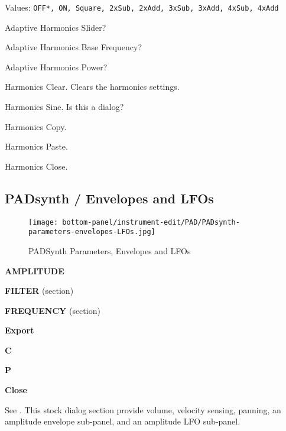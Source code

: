    Values: \texttt{OFF*, ON, Square, 2xSub, 2xAdd, 3xSub, 3xAdd, 4xSub, 4xAdd}

   Adaptive Harmonics Slider?

   Adaptive Harmonics Base Frequency?

   Adaptive Harmonics Power?

   Harmonics Clear.
   Clears the harmonics settings.

   Harmonics Sine.  Is this a dialog?

   Harmonics Copy.

   Harmonics Paste.

   Harmonics Close.

\subsection{PADsynth / Envelopes and LFOs}
\label{subsec:padsynth_envelopes_lfos}

\begin{figure}[H]
   \centering 
   \texttt{[image: bottom-panel/instrument-edit/PAD/PADsynth-parameters-envelopes-LFOs.jpg]}
   \caption{PADSynth Parameters, Envelopes and LFOs}
   \label{fig:padsynth_parameters_envelopes_and_lfos}
\end{figure}

   \begin{enumber}
      \item \textbf{AMPLITUDE}
      \item \textbf{FILTER} (section)
      \item \textbf{FREQUENCY} (section)
      \item \textbf{Export}
      \item \textbf{C}
      \item \textbf{P}
      \item \textbf{Close}
   \end{enumber}

   See .
   This stock dialog section provide volume, velocity sensing, panning, an
   amplitude envelope sub-panel, and an amplitude LFO sub-panel.

